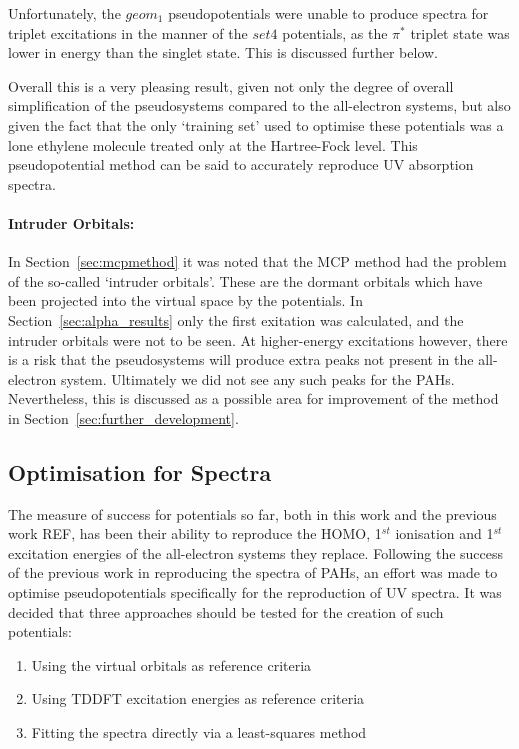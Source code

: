 \documentclass[aip,reprint,nofootinbib]{revtex4-1}
\begin{document}
Unfortunately, the $geom_1$ pseudopotentials were unable to produce spectra for triplet excitations in the manner of the $set4$ potentials, as the $\pi^{*}$ triplet state was lower in energy than the singlet state. This is discussed further below.

Overall this is a very pleasing result, given not only the degree of overall simplification of the pseudosystems compared to the all-electron systems, but also given the fact that the only `training set' used to optimise these potentials was a lone ethylene molecule treated only at the Hartree-Fock level. This pseudopotential method can be said to accurately reproduce UV absorption spectra.

\paragraph{Intruder Orbitals:} In Section~\ref{sec:mcpmethod} it was noted that the MCP method had the problem of the so-called `intruder orbitals'. These are the dormant orbitals which have been projected into the virtual space by the potentials. In Section~\ref{sec:alpha_results} only the first exitation was calculated, and the intruder orbitals were not to be seen. At higher-energy excitations however, there is a risk that the pseudosystems will produce extra peaks not present in the all-electron system. Ultimately we did not see any such peaks for the PAHs. Nevertheless, this is discussed as a possible area for improvement of the method in Section~\ref{sec:further_development}.

\subsection{Optimisation for Spectra}
\label{sec:spectralopt}

The measure of success for potentials so far, both in this work and the previous work REF, has been their ability to reproduce the HOMO, 1$^{st}$ ionisation and 1$^{st}$ excitation energies of the all-electron systems they replace. Following the success of the previous work in reproducing the spectra of PAHs, an effort was made to optimise pseudopotentials specifically for the reproduction of UV spectra. It was decided that three approaches should be tested for the creation of such potentials:

\begin{enumerate}
\item Using the virtual orbitals as reference criteria
\item Using TDDFT excitation energies as reference criteria
\item Fitting the spectra directly via a least-squares method
\end{enumerate}
\end{document}
